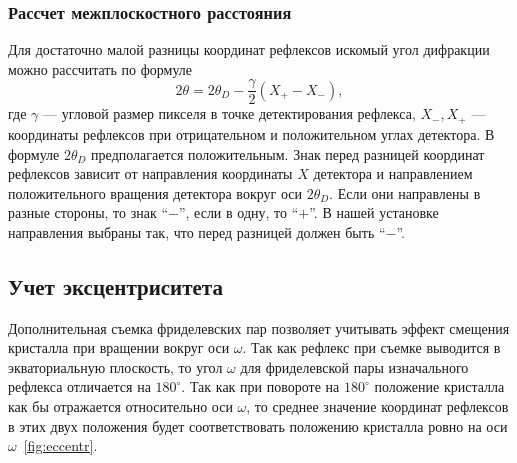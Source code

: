 \documentclass[a4paper,14pt]{extarticle}
\newcommand{\degree}{^\circ}
\begin{document}
\subsubsection{Рассчет межплоскостного расстояния}
Для достаточно малой разницы координат рефлексов искомый угол дифракции можно рассчитать по формуле
\begin{equation} \label{eq:bond2}
    2\theta = 2\theta_D - \frac{\gamma}{2} (X_{+} - X_{-}),
\end{equation}
где $\gamma$ --- угловой размер пикселя в точке детектирования рефлекса, $X_{-}, X_{+}$ --- координаты рефлексов при отрицательном и положительном углах детектора.
В формуле $2\theta_D$ предполагается положительным.
Знак перед разницей координат рефлексов зависит от направления координаты $X$ детектора и направлением положительного вращения детектора вокруг оси $2\theta_D$.
Если они направлены в разные стороны, то знак ``$-$'', если в одну, то ``$+$''.
В нашей установке направления выбраны так, что перед разницей должен быть ``$-$''.
\subsection{Учет эксцентриситета}
Дополнительная съемка фриделевских пар позволяет учитывать эффект смещения кристалла при вращении вокруг оси $\omega$.
Так как рефлекс при съемке выводится в экваториальную плоскость, то угол $\omega$ для фриделевской пары изначального рефлекса отличается на $180\degree$.
Так как при повороте на $180\degree$ положение кристалла как бы отражается относительно оси $\omega$, то среднее значение координат рефлексов в этих двух положения будет соответствовать положению кристалла ровно на оси $\omega$~\ref{fig:eccentr}.
\end{document}
